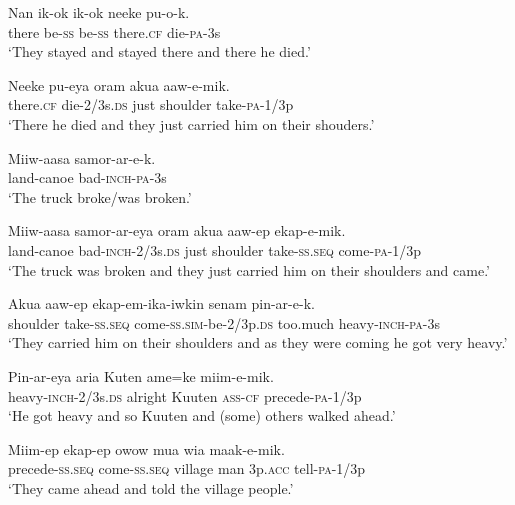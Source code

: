 \ea
\gll  Nan  ik-ok  ik-ok  neeke  pu-o-k. \\
there  be-\textsc{ss}  be-\textsc{ss}  there.\textsc{cf}  die-\textsc{pa}-3s \\
\glt ‘They stayed and stayed there and there he died.’ \\
\z


\ea
\gll  Neeke  pu-eya  oram  akua  aaw-e-mik. \\
there.\textsc{cf}  die-2/3s.\textsc{ds}  just  shoulder  take-\textsc{pa}-1/3p \\
\glt ‘There he died and they just carried him on their shouders.’ \\
\z


\ea
\gll  Miiw-aasa  samor-ar-e-k. \\
land-canoe  bad-\textsc{inch}-\textsc{pa}-3s \\
\glt ‘The truck broke/was broken.’ \\
\z


\ea
\gll  Miiw-aasa  samor-ar-eya  oram  akua  aaw-ep  ekap-e-mik. \\
land-canoe  bad-\textsc{inch}-2/3s.\textsc{ds}  just  shoulder  take-\textsc{ss.seq}  come-\textsc{pa}-1/3p \\
\glt ‘The truck was broken and they just carried him on their shoulders and came.’ \\
\z


\ea
\gll  Akua  aaw-ep  ekap-em-ika-iwkin  senam             pin-ar-e-k. \\
shoulder  take-\textsc{ss.seq}  come-\textsc{ss}.\textsc{sim}-be-2/3p.\textsc{ds}  too.much  heavy-\textsc{inch}-\textsc{pa}-3s \\


\glt ‘They carried him on their shoulders and as they were coming he got very heavy.’ \\
\z


\ea
\gll  Pin-ar-eya  aria  Kuten  ame=ke  miim-e-mik. \\
heavy-\textsc{inch}-2/3s.\textsc{ds}  alright  Kuuten  \textsc{ass}-\textsc{cf}  precede-\textsc{pa}-1/3p \\
\glt ‘He got heavy and so Kuuten and (some) others walked ahead.’ \\
\z


\ea
\gll  Miim-ep  ekap-ep  owow  mua  wia  maak-e-mik. \\
precede-\textsc{ss.seq}  come-\textsc{ss.seq}  village  man  3p.\textsc{acc}  tell-\textsc{pa}-1/3p \\
\glt ‘They came ahead and told the village people.’ \\
\z


